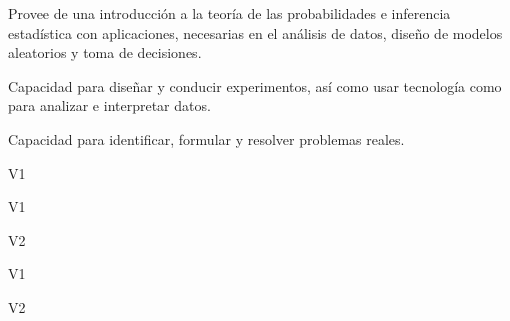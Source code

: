 
\begin{syllabus}


\begin{justification}
Provee de una introducción a la teoría de las probabilidades e inferencia estadística con aplicaciones, necesarias en el análisis de datos, diseño de modelos aleatorios y toma de decisiones.
\end{justification}

\begin{goals}
   \item Capacidad para diseñar y conducir experimentos, así como usar tecnología como para analizar e interpretar datos.
   \item Capacidad para identificar, formular y resolver problemas reales.
\end{goals}

\begin{outcomes}{V1}
      \item {}
      \item {}
\end{outcomes}

\begin{specificoutcomes}{V1}
      \item {}
      \item {}
      \item {}
      \item {}
      \item {}
\end{specificoutcomes}

\begin{outcomes}{V2}
   \item {}
   \item {}
\end{outcomes}

\begin{competences}{V1}
   \item {}
   \item {}
\end{competences} 

\begin{competences}{V2}
   \item {}
   \item {}
\end{competences}


\end{syllabus}
